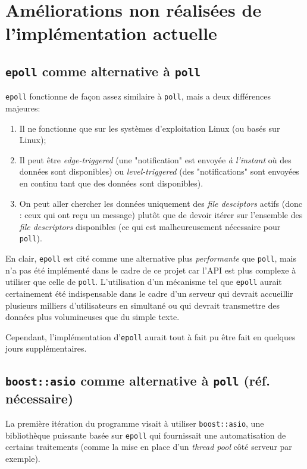 \documentclass{article}
\begin{document}
\section{Améliorations non réalisées de l'implémentation actuelle}
\subsection{\texttt{epoll} comme alternative à \texttt{poll}}
\texttt{epoll} \cite{epoll} fonctionne de façon assez similaire à \texttt{poll}, mais a deux différences majeures:
\begin{enumerate}
    \item Il ne fonctionne que sur les systèmes d'exploitation Linux (ou basés sur Linux);
    \item Il peut être \textit{edge-triggered} (une "notification" est envoyée \textit{à l'instant} où des données sont disponibles) ou \textit{level-triggered} (des "notifications" sont envoyées en continu tant que des données sont disponibles). \cite{LevelEdgeTrigger}
    \item On peut aller chercher les données uniquement des \textit{file desciptors} actifs (donc : ceux qui ont reçu un message) plutôt que de devoir itérer sur l'ensemble des \textit{file descriptors} disponibles (ce qui est malheureusement nécessaire pour \texttt{poll}). \cite{EpollTrigger}
\end{enumerate}

\noindent En clair, \texttt{epoll} est cité comme une alternative plus \textit{performante} que \texttt{poll}, mais n'a pas été implémenté dans le cadre de ce projet car l'API est plus complexe à utiliser que celle de \texttt{poll}. L'utilisation d'un mécanisme tel que \texttt{epoll} aurait certainement été indispensable dans le cadre d'un serveur qui devrait accueillir plusieurs milliers d'utilisateurs en simultané ou qui devrait transmettre des données plus volumineuses que du simple texte.

Cependant, l'implémentation d'\texttt{epoll} aurait tout à fait pu être fait en quelques jours supplémentaires.

\subsection{\texttt{boost::asio} comme alternative à \texttt{poll} (réf. nécessaire)}
La première itération du programme visait à utiliser \texttt{boost::asio}, une bibliothèque puissante basée sur \texttt{epoll} qui fournissait une automatisation de certains traitements (comme la mise en place d'un \textit{thread pool} côté serveur par exemple).
\end{document}

